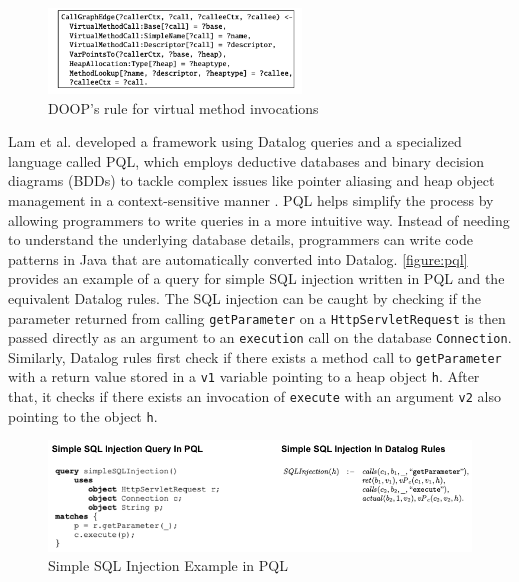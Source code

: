 \begin{figure}[h]
    \centering
    \includegraphics[width=0.6\textwidth]{Packages/Doop.png}
    \caption{DOOP's rule for virtual method invocations \cite{Bravenboer2009}}
    \label{figure:doop}
\end{figure}

Lam et al. developed a framework using Datalog queries and a specialized language called PQL, which employs deductive databases and binary decision diagrams (BDDs) to tackle complex issues like pointer aliasing and heap object management in a context-sensitive manner \cite{Lam2005}. PQL helps simplify the process by allowing programmers to write queries in a more intuitive way. Instead of needing to understand the underlying database details, programmers can write code patterns in Java that are automatically converted into Datalog. \autoref{figure:pql} provides an example of a query for simple SQL injection written in PQL and the equivalent Datalog rules. The SQL injection can be caught by checking if the parameter returned from calling \texttt{getParameter} on a \texttt{HttpServletRequest} is then passed directly as an argument to an \texttt{execution} call on the database \texttt{Connection}. Similarly, Datalog rules first check if there exists a method call to \texttt{getParameter} with a return value stored in a \texttt{v1} variable pointing to a heap object \texttt{h}. After that, it checks if there exists an invocation of \texttt{execute} with an argument \texttt{v2} also pointing to the object \texttt{h}.

\begin{figure}[h]
    \centering
    \includegraphics[width=1\textwidth]{Packages/PQL.png}
    \caption{Simple SQL Injection Example in PQL \cite{Lam2005}}
    \label{figure:pql}
\end{figure}

